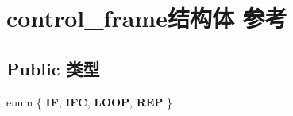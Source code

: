 \hypertarget{structcontrol__frame}{}\section{control\+\_\+frame结构体 参考}
\label{structcontrol__frame}
\subsection*{Public 类型}
\begin{DoxyCompactItemize}
\item 
\mbox{\label{structcontrol__frame_a470a544aadd862295ee8732b70f057fa}} 
enum \{ {\bfseries IF}, 
{\bfseries I\+FC}, 
{\bfseries L\+O\+OP}, 
{\bfseries R\+EP}
 \}
\end{DoxyCompactItemize}
